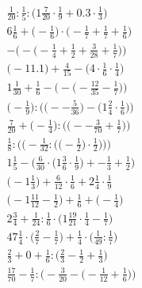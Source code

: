 \documentclass[8pt]{article}
\begin{document}
\begin{align}
\frac{1}{20} : \frac{1}{5} : \big(1\frac{7}{20} \cdot \frac{1}{9} + 0.3 \cdot \frac{1}{3}\big) \\
6\frac{1}{6} + \big(-\frac{1}{6}\big) \cdot \big(-\frac{1}{7} + \frac{1}{7} + \frac{1}{6}\big) \\
-\Big(-\big(-\frac{1}{4} + \frac{1}{2} + \frac{3}{28} + \frac{1}{7}\big)\Big) \\
\big(-11.1\big) + \frac{4}{15} - \big(4 \cdot \frac{1}{6} \cdot \frac{1}{4}\big) \\
1\frac{1}{30} + \frac{1}{6} - \Big(-\big(-\frac{12}{35} - \frac{1}{7}\big)\Big) \\
\Big(-\frac{1}{9}\Big) : \Big(\big(--\frac{5}{36}\big) - \big(1\frac{2}{4} \cdot \frac{1}{6}\big)\Big) \\
\frac{7}{20} + \Big(-\frac{1}{4}\Big) : \Big(\big(--\frac{3}{70} + \frac{1}{7}\big)\Big) \\
\frac{1}{8} : \Bigg(\bigg(-\frac{1}{32} : \Big(\big(-\frac{1}{2}\big) \cdot \frac{1}{2}\Big)\bigg)\Bigg) \\
1\frac{1}{5} - \Big(\frac{6}{30} \cdot \big(1\frac{3}{6} \cdot \frac{1}{9}\big) + -\frac{1}{3} + \frac{1}{2}\Big) \\
\big(-1\frac{1}{3}\big) + \frac{6}{12} \cdot \frac{1}{6} + 2\frac{1}{4} \cdot \frac{1}{9} \\
\big(-1\frac{11}{12} - \frac{1}{2}\big) + \frac{1}{6} + \big(-\frac{1}{4}\big) \\
2\frac{3}{4} + \frac{1}{24} : \frac{1}{6} \cdot \big(1\frac{19}{21} \cdot \frac{1}{4} - \frac{1}{7}\big) \\
47\frac{1}{4} \cdot \big(\frac{2}{7} - \frac{1}{7}\big) + \frac{1}{4} \cdot \big(\frac{1}{49} : \frac{1}{7}\big) \\
\frac{2}{3} + 0 + \frac{1}{6} : \big(\frac{2}{3} - \frac{1}{2} + \frac{1}{3}\big) \\
\frac{17}{70} - \frac{1}{7} : \Big(-\frac{3}{20} - \big(-\frac{1}{12} + \frac{1}{6}\big)\Big)
\end{align}
\end{document}
